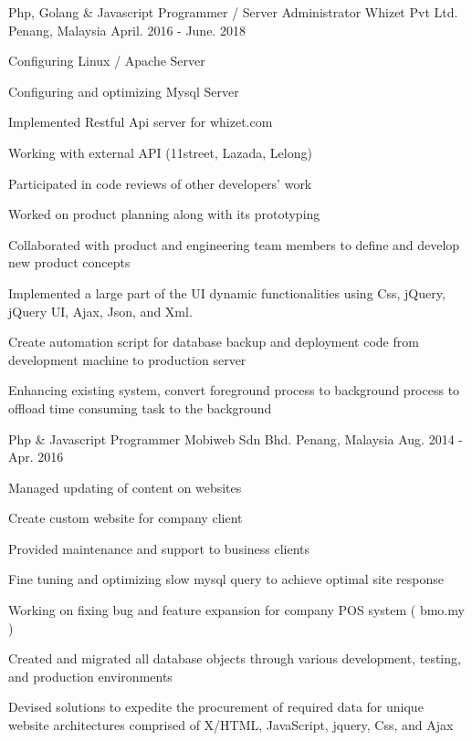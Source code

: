\begin{cventries}
  \cventry
    {Php, Golang \& Javascript Programmer / Server Administrator} %
    {Whizet Pvt Ltd.} %
    {Penang, Malaysia} %
    {April. 2016 - June. 2018} %
    {
      \begin{cvitems} %
      	\item Configuring Linux / Apache Server
        \item Configuring and optimizing Mysql Server
       	\item Implemented Restful Api server for whizet.com
      	\item Working with external API (11street, Lazada, Lelong) 
        \item Participated in code reviews of other developers’ work
        \item Worked on product planning along with its prototyping
        \item Collaborated with product and engineering team members to define and develop new product concepts
        \item Implemented a large part of the UI dynamic functionalities using Css, jQuery, jQuery UI, Ajax, Json, and Xml.
        \item Create automation script for database backup and deployment code from development machine to production server
        \item Enhancing existing system, convert foreground process to background process to offload time consuming task to the background  
      \end{cvitems}
    }

  \cventry
    {Php \& Javascript Programmer} %
    {Mobiweb Sdn Bhd.} %
    {Penang, Malaysia} %
    {Aug. 2014 - Apr. 2016} %
    {
      \begin{cvitems} %
      	\item Managed updating of content on websites
      	\item Create custom website for company client
        \item Provided maintenance and support to business clients
        \item Fine tuning and optimizing slow mysql query to achieve optimal site response
        \item Working on fixing bug and feature expansion for company POS system ( bmo.my )
        \item Created and migrated all database objects through various development, testing, and production environments
        \item Devised solutions to expedite the procurement of required data for unique website architectures comprised of X/HTML, JavaScript, jquery, Css, and Ajax
      \end{cvitems}
    }


\end{cventries}

